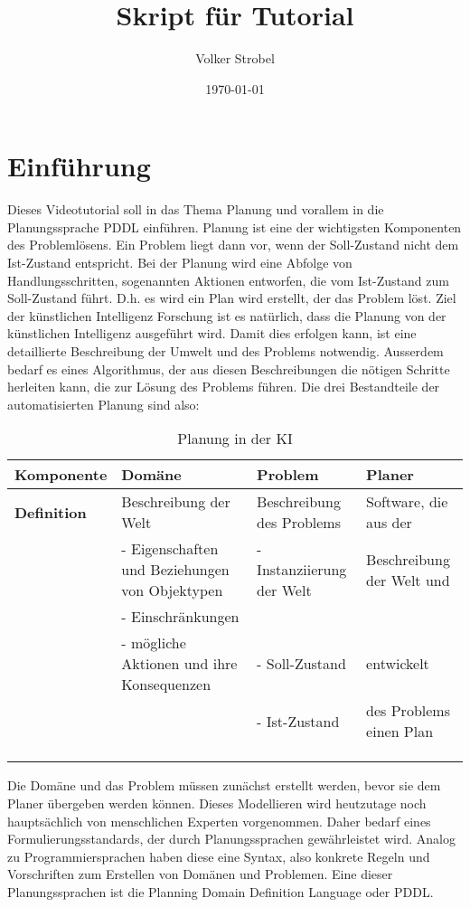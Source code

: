 \documentclass[koma,DIV=1,BCOR=1mm]{article}
\author{Volker Strobel}
\date{\today}
\title{Skript für Tutorial}
\begin{document}
\maketitle
\section{Einführung}
\label{sec-1}
Dieses Videotutorial soll in das Thema Planung und vorallem in die
Planungssprache PDDL einführen. Planung ist eine der wichtigsten
Komponenten des Problemlösens. Ein Problem liegt dann vor, wenn der
Soll-Zustand nicht dem Ist-Zustand entspricht. Bei der Planung wird
eine Abfolge von Handlungsschritten, sogenannten Aktionen entworfen,
die vom Ist-Zustand zum Soll-Zustand führt. D.h. es wird ein Plan wird
erstellt, der das Problem löst. Ziel der künstlichen Intelligenz
Forschung ist es natürlich, dass die Planung von der künstlichen
Intelligenz ausgeführt wird. Damit dies erfolgen kann, ist eine
detaillierte Beschreibung der Umwelt und des Problems notwendig.
Ausserdem bedarf es eines Algorithmus, der aus diesen Beschreibungen
die nötigen Schritte herleiten kann, die zur Lösung des Problems
führen. Die drei Bestandteile der automatisierten Planung sind also:

\begin{table}[htb]
\caption{Planung in der KI}
\centering
\footnotesize
\begin{tabular}{l|lll}
\textbf{Komponente} & \textbf{Domäne} & \textbf{Problem} & \textbf{Planer}\\
\hline
\textbf{Definition} & Beschreibung der Welt & Beschreibung des Problems & Software, die aus der\\
 & - Eigenschaften und Beziehungen von Objektypen & - Instanziierung der Welt & Beschreibung der Welt und\\
 & - Einschränkungen &  & \\
 & - mögliche Aktionen und ihre Konsequenzen & - Soll-Zustand & entwickelt\\
 &  & - Ist-Zustand & des Problems einen Plan\\
 &  &  & \\
 &  &  & \\
 &  &  & \\
\end{tabular}
\end{table}


Die Domäne und das Problem müssen zunächst erstellt werden, bevor sie
dem Planer übergeben werden können. Dieses Modellieren wird heutzutage
noch hauptsächlich von menschlichen Experten vorgenommen. Daher bedarf
eines Formulierungsstandards, der durch Planungssprachen gewährleistet
wird. Analog zu Programmiersprachen haben diese eine Syntax, also
konkrete Regeln und Vorschriften zum Erstellen von Domänen und
Problemen. Eine dieser Planungssprachen ist die Planning Domain
Definition Language oder PDDL.
\end{document}
